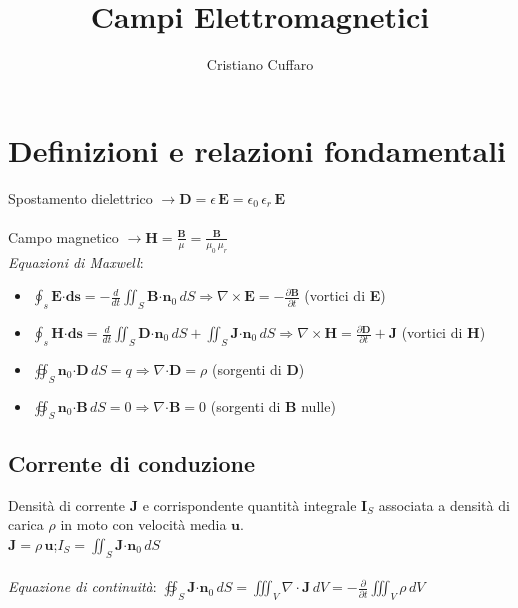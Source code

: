 \documentclass[a4paper]{article}
\begin{document}
\title{Campi Elettromagnetici}
\author{Cristiano Cuffaro}
\date{}
\maketitle

\section{Definizioni e relazioni fondamentali\\}

Spostamento dielettrico $\rightarrow \textbf{D} = \epsilon\,\textbf{E} = \epsilon_0\,\epsilon_r\,\textbf{E}$\\\\Campo magnetico $\rightarrow \textbf{H} = \frac{\textbf{B}}{\mu} = \frac{\textbf{B}}{\mu_0\,\mu_r}$\\

\emph{Equazioni di Maxwell}:

\begin{itemize}
\item $\oint_{s} \textbf{E·ds} = -\frac{d}{dt} \iint_{S} \textbf{B·n}_0 \,dS \Rightarrow \nabla\times\textbf{E} = -\frac{\partial\textbf{B}}{\partial t}$ (vortici di \textbf{E})

\item $\oint_{s} \textbf{H·ds} = \frac{d}{dt} \iint_{S} \textbf{D·n}_0 \,dS + \iint_{S}\textbf{J·n}_0 \,dS \Rightarrow \nabla\times\textbf{H} = \frac{\partial\textbf{D}}{\partial t} + \textbf{J}$ (vortici di \textbf{H})

\item$\oiint_{S}\textbf{n}_0\textbf{·D}\,dS = q \Rightarrow \nabla\textbf{·D} = \rho$ (sorgenti di \textbf{D})

\item$\oiint_{S}\textbf{n}_0\textbf{·B}\,dS = 0 \Rightarrow \nabla\textbf{·B} = 0$ (sorgenti di \textbf{B} nulle)
\end{itemize}

\subsection*{Corrente di conduzione}
Densità di corrente $\textbf{J}$ e corrispondente quantità integrale $\textbf{I}_S$ associata a densità di carica $\rho$ in moto con velocità media $\textbf{u}$.\\

$\textbf{J} = \rho\,\textbf{u}$;\hspace{10mm}$I_S = \iint_{S}\textbf{J·}\textbf{n}_0\,dS$\\\\
\emph{Equazione di continuità}: $\oiint_{S}\textbf{J·}\textbf{n}_0\,dS = \iiint_{V}\nabla\cdot\textbf{J}\,dV = -\frac{\partial}{\partial t}\iiint_{V}\rho\,dV$\\
\end{document}
